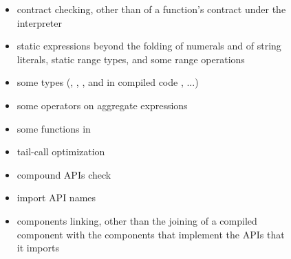 \begin{figure}[p]
\begin{itemize}
\item contract checking, other than of a function's contract under the
interpreter
\item static expressions beyond the folding of numerals and of string literals,
static range types, and some range operations
\item some types (,
, ,
and in compiled code , ...)
\item some operators on aggregate expressions
\item some functions in 
\item tail-call optimization
\item compound APIs check
\item import API names
\item components linking, other than the joining of a compiled component with
the components that implement the APIs that it imports
\end{itemize}

\end{figure}



